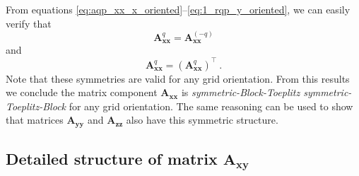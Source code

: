 \documentclass[manuscript]{geophysics}
\begin{document}
	From equations \ref{eq:aqp_xx_x_oriented}--\ref{eq:1_rqp_y_oriented}, we can easily verify that
	\begin{equation}
		\mathbf{A}_{\boldsymbol{xx}}^{q} = \mathbf{A}_{\boldsymbol{xx}}^{(-q)}
		\label{eq:Axx_q_external_block_symmetry}
	\end{equation}
	and
	\begin{equation}
		\mathbf{A}_{\boldsymbol{xx}}^{q} = \left(\mathbf{A}_{\boldsymbol{xx}}^{q} \right)^{\top} \: .
		\label{eq:Axx_q_internal_block_symmetry}
	\end{equation}
	Note that these symmetries are valid for 
	any grid orientation.
	From this results we conclude the matrix component 
	$\mathbf{A}_{\boldsymbol{xx}}$ is \textit{symmetric-Block-Toeplitz symmetric-Toeplitz-Block} 
	for any grid orientation.
	The same reasoning can be used to show that matrices $\mathbf{A}_{\boldsymbol{yy}}$ and
	$\mathbf{A}_{\boldsymbol{zz}}$ also have this symmetric structure.
	
	\subsection{Detailed structure of matrix $\mathbf{A_{xy}}$}
	
\end{document}
